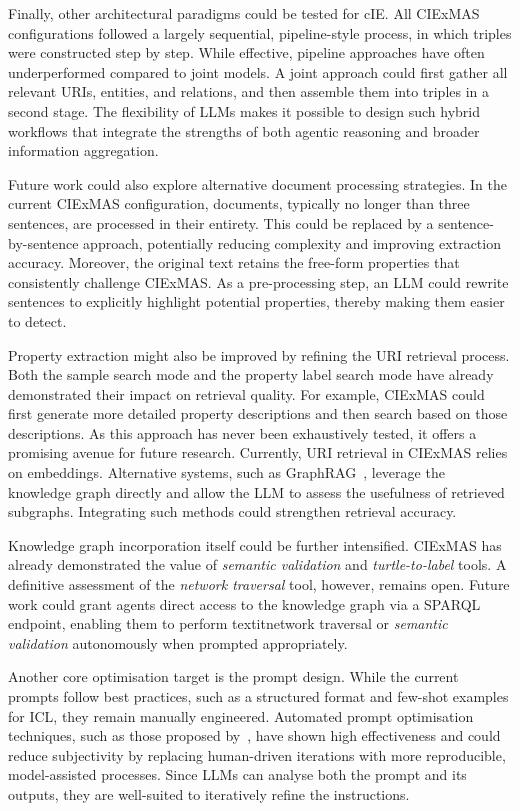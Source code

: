 \documentclass[a4paper,oneside,bibliography=totoc]{scrbook}
\begin{document}
Finally, other architectural paradigms could be tested for \ac{cIE}. All CIExMAS configurations followed a largely sequential, pipeline-style process, in which triples were constructed step by step. While effective, pipeline approaches have often underperformed compared to joint models. A joint approach could first gather all relevant \acp{URI}, entities, and relations, and then assemble them into triples in a second stage. The flexibility of \acp{LLM} makes it possible to design such hybrid workflows that integrate the strengths of both agentic reasoning and broader information aggregation.

Future work could also explore alternative document processing strategies. In the current CIExMAS configuration, documents, typically no longer than three sentences, are processed in their entirety. This could be replaced by a sentence-by-sentence approach, potentially reducing complexity and improving extraction accuracy. Moreover, the original text retains the free-form properties that consistently challenge CIExMAS. As a pre-processing step, an \ac{LLM} could rewrite sentences to explicitly highlight potential properties, thereby making them easier to detect.

Property extraction might also be improved by refining the \ac{URI} retrieval process. Both the sample search mode and the property label search mode have already demonstrated their impact on retrieval quality. For example, CIExMAS could first generate more detailed property descriptions and then search based on those descriptions. As this approach has never been exhaustively tested, it offers a promising avenue for future research. Currently, \ac{URI} retrieval in CIExMAS relies on embeddings. Alternative systems, such as GraphRAG~\cite{Edge2025}, leverage the knowledge graph directly and allow the \ac{LLM} to assess the usefulness of retrieved subgraphs. Integrating such methods could strengthen retrieval accuracy.

Knowledge graph incorporation itself could be further intensified. CIExMAS has already demonstrated the value of \textit{semantic validation} and \textit{turtle-to-label} tools. A definitive assessment of the \textit{network traversal} tool, however, remains open. Future work could grant agents direct access to the knowledge graph via a \ac{SPARQL} endpoint, enabling them to perform textit{network traversal} or \textit{semantic validation} autonomously when prompted appropriately.

Another core optimisation target is the prompt design. While the current prompts follow best practices, such as a structured format and few-shot examples for \ac{ICL}, they remain manually engineered. Automated prompt optimisation techniques, such as those proposed by~\citet{Agrawal2025}, have shown high effectiveness and could reduce subjectivity by replacing human-driven iterations with more reproducible, model-assisted processes. Since \acp{LLM} can analyse both the prompt and its outputs, they are well-suited to iteratively refine the instructions.
\end{document}
